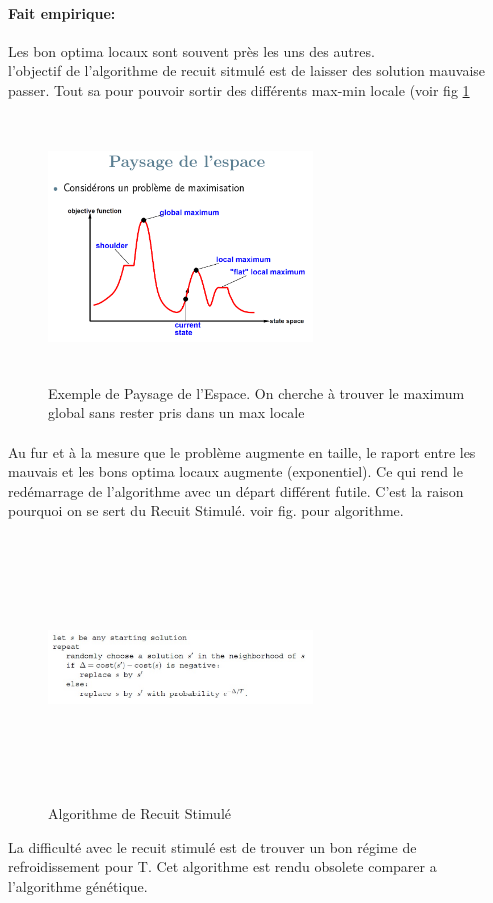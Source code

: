 \documentclass[oneside]{book}
\begin{document}
\paragraph{Fait empirique:} Les bon optima locaux sont souvent près les uns des autres.\\

l'objectif de l'algorithme de recuit sitmulé est de laisser des solution mauvaise passer. Tout sa pour pouvoir sortir des différents max-min locale (voir fig \ref{fig:paysage_espace}

\begin{figure}[!ht]
\centering
\includegraphics[width = 7cm, height = 7cm, keepaspectratio]{Paysage_Espace.png}
\caption{Exemple de Paysage de l'Espace. On cherche à trouver le maximum global sans rester pris dans un max locale}
\label{fig:paysage_espace}
\end{figure}
\paragraph{}
Au fur et à la mesure que le problème augmente en taille, le raport entre les mauvais et les bons optima locaux augmente (exponentiel). Ce qui rend le redémarrage de l'algorithme avec un départ différent futile. C'est la raison pourquoi on se sert du Recuit Stimulé. voir fig. pour algorithme.

\begin{figure}[!ht]
\centering
\includegraphics[width = 7cm, height = 7cm, keepaspectratio]{Recuit_Stimule.png}
\caption{Algorithme de Recuit Stimulé}
\label{fig:recuit_stimule}
\end{figure}
La difficulté avec le recuit stimulé est de trouver un bon régime de refroidissement pour T. Cet algorithme est rendu obsolete comparer a l'algorithme génétique.
\end{document}
